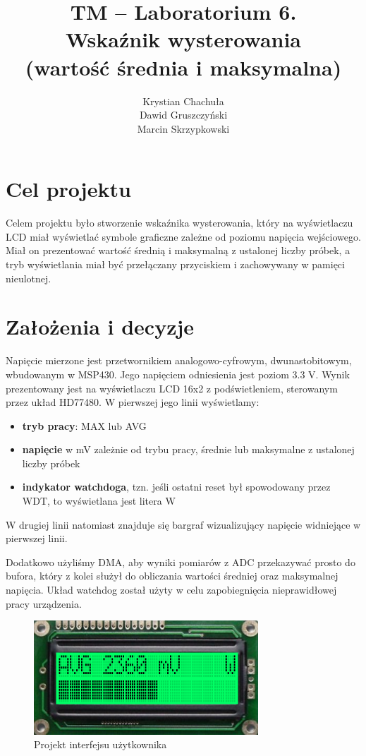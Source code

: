 \documentclass[fleqn]{article}
\title{TM -- Laboratorium 6. \\ \large Wskaźnik wysterowania \\ (wartość średnia i maksymalna)}
\author{Krystian Chachuła \\ Dawid Gruszczyński \\ Marcin Skrzypkowski}
\begin{document}
\maketitle

\setcounter{page}{0}
\thispagestyle{empty}

\pagebreak

\setcounter{page}{1}

\section{Cel projektu}

Celem projektu było stworzenie wskaźnika wysterowania, który na wyświetlaczu LCD miał wyświetlać symbole graficzne zależne od poziomu napięcia wejściowego. Miał on prezentować wartość średnią i maksymalną z ustalonej liczby próbek, a tryb wyświetlania miał być przełączany przyciskiem i zachowywany w pamięci nieulotnej.

\section{Założenia i decyzje}

Napięcie mierzone jest przetwornikiem analogowo-cyfrowym, dwunastobitowym, wbudowanym w MSP430. Jego napięciem odniesienia jest poziom 3.3 V. Wynik prezentowany jest na wyświetlaczu LCD 16x2 z podświetleniem, sterowanym przez układ HD77480. W pierwszej jego linii wyświetlamy:
\begin{itemize}
	\item \textbf{tryb pracy}: MAX lub AVG
	\item \textbf{napięcie} w mV zależnie od trybu pracy, średnie lub maksymalne z ustalonej liczby próbek
	\item \textbf{indykator watchdoga}, tzn. jeśli ostatni reset był spowodowany przez WDT, to wyświetlana jest litera W
\end{itemize}
W drugiej linii natomiast znajduje się bargraf wizualizujący napięcie widniejące w pierwszej linii.

Dodatkowo użyliśmy DMA, aby wyniki pomiarów z ADC przekazywać prosto do bufora, który z kolei służył do obliczania wartości średniej oraz maksymalnej napięcia. Układ watchdog został użyty w celu zapobiegnięcia nieprawidłowej pracy urządzenia.

\begin{figure}[H]
	\centering
	\includegraphics[width=0.75\textwidth]{img/ui.png}
	\caption{Projekt interfejsu użytkownika}
\end{figure}
\end{document}
